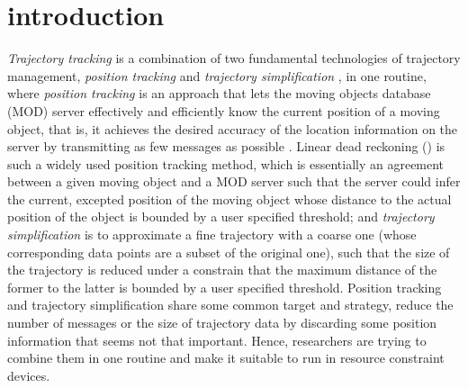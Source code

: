 

\section{introduction}
\label{sec-intro}


\textit{Trajectory tracking} \cite{Lange:Tracking} is a combination of two fundamental technologies of trajectory management, \textit{position tracking} \cite{Wolfson:PositionTracking,Leonhardi:Comparison} and \textit{trajectory simplification} \cite{Lin:Cised,Zhang:Evaluation}, in one routine, where \textit{position tracking} is an approach that lets the moving objects database (MOD) server effectively and efficiently know the current position of a moving object, that is, it achieves the desired accuracy of the location information on the server by transmitting as few messages as possible \cite{Leonhardi:Comparison}. Linear dead reckoning (\ldr) \cite{Wolfson:PositionTracking} is such a widely used position tracking method, which is essentially an agreement between a given moving object and a MOD server such that the server could infer the current, excepted position of the moving object whose distance to the actual position of the object is bounded by a user specified threshold;
%
and \textit{trajectory simplification} \cite{Lin:Cised,Zhang:Evaluation} is to approximate a fine trajectory with a coarse one (whose corresponding data points are a subset of the original one), such that the size of the trajectory is reduced under a constrain that the maximum distance of the former to the latter is bounded by a user specified threshold. 
%
Position tracking and trajectory simplification share some common target and strategy, \ie reduce the number of messages or the size of trajectory data by discarding some position information that seems not that important. Hence, researchers are trying to combine them in one routine and make it suitable to run in resource constraint devices.

